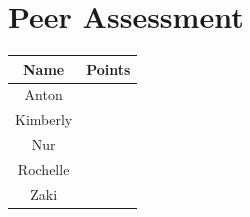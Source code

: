 \documentclass{article}
\begin{document}
	
\section{Peer Assessment}
\begin{tabular}{|c|c|}
	\hline Name & Points \\ 
	\hline Anton &  \\ 
	\hline Kimberly &  \\ 
	\hline Nur &  \\ 
	\hline Rochelle &  \\ 
	\hline  Zaki &  \\ 
	\hline 
\end{tabular} 
	


\end{document}
